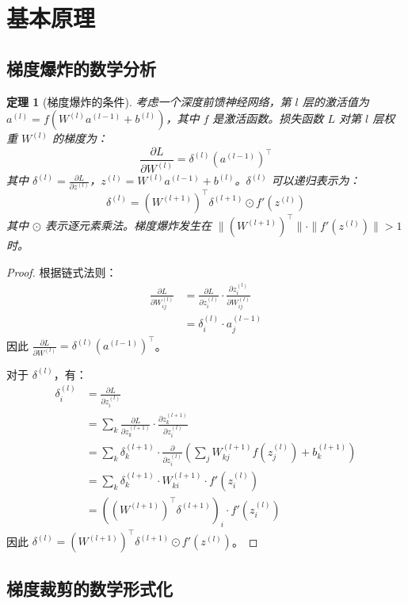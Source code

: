 \documentclass{article}
\newtheorem{theorem}{定理}[section]
\begin{document}
\section{基本原理}

\subsection{梯度爆炸的数学分析}

\begin{theorem}[梯度爆炸的条件]
考虑一个深度前馈神经网络，第 $l$ 层的激活值为 $a^{(l)} = f(W^{(l)} a^{(l-1)} + b^{(l)})$，其中 $f$ 是激活函数。损失函数 $L$ 对第 $l$ 层权重 $W^{(l)}$ 的梯度为：
\[
\frac{\partial L}{\partial W^{(l)}} = \delta^{(l)} (a^{(l-1)})^\top
\]
其中 $\delta^{(l)} = \frac{\partial L}{\partial z^{(l)}}$，$z^{(l)} = W^{(l)} a^{(l-1)} + b^{(l)}$。$\delta^{(l)}$ 可以递归表示为：
\[
\delta^{(l)} = (W^{(l+1)})^\top \delta^{(l+1)} \odot f'(z^{(l)})
\]
其中 $\odot$ 表示逐元素乘法。梯度爆炸发生在 $\| (W^{(l+1)})^\top \| \cdot \| f'(z^{(l)}) \| > 1$ 时。
\end{theorem}

\begin{proof}
根据链式法则：
\begin{align*}
\frac{\partial L}{\partial W_{ij}^{(l)}} &= \frac{\partial L}{\partial z_i^{(l)}} \cdot \frac{\partial z_i^{(l)}}{\partial W_{ij}^{(l)}} \\
&= \delta_i^{(l)} \cdot a_j^{(l-1)}
\end{align*}
因此 $\frac{\partial L}{\partial W^{(l)}} = \delta^{(l)} (a^{(l-1)})^\top$。

对于 $\delta^{(l)}$，有：
\begin{align*}
\delta_i^{(l)} &= \frac{\partial L}{\partial z_i^{(l)}} \\
&= \sum_k \frac{\partial L}{\partial z_k^{(l+1)}} \cdot \frac{\partial z_k^{(l+1)}}{\partial z_i^{(l)}} \\
&= \sum_k \delta_k^{(l+1)} \cdot \frac{\partial}{\partial z_i^{(l)}} \left( \sum_j W_{kj}^{(l+1)} f(z_j^{(l)}) + b_k^{(l+1)} \right) \\
&= \sum_k \delta_k^{(l+1)} \cdot W_{ki}^{(l+1)} \cdot f'(z_i^{(l)}) \\
&= \left( (W^{(l+1)})^\top \delta^{(l+1)} \right)_i \cdot f'(z_i^{(l)})
\end{align*}
因此 $\delta^{(l)} = (W^{(l+1)})^\top \delta^{(l+1)} \odot f'(z^{(l)})$。
\end{proof}

\subsection{梯度裁剪的数学形式化}
\end{document}
